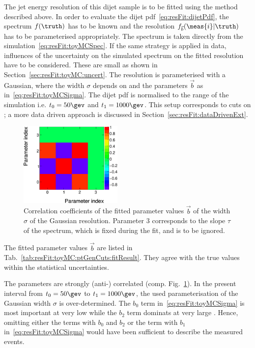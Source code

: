 \documentclass[a4paper]{cmspaper} %
\begin{document}
The jet energy resolution of this dijet sample is to be fitted using the method described above.
In order to evaluate the dijet pdf~\eqref{eq:resFit:dijetPdf}, the spectrum $f(\truth)$ has to be known and the resolution $f_{\vec{b}}(\meas{i}|\truth)$ has to be parameterised appropriately.
The spectrum is taken directly from the simulation~\eqref{eq:resFit:toyMCSpec}.
If the same strategy is applied in data, influences of the uncertainty on the simulated spectrum on the fitted resolution have to be considered.
These are small as shown in Section~\ref{sec:resFit:toyMC:uncert}.
The resolution is parameterised with a Gaussian, where the width $\sigma$ depends on \truth and the parameters $\vec{b}$ as in~\eqref{eq:resFit:toyMCSigma}.
The dijet pdf is normalised to the \truth range of the simulation i.e. $t_{0} = 50\gev$ and $t_{1} = 1000\gev$.
This setup corresponds to cuts on \truth; a more data driven approach is discussed in Section~\ref{sec:resFit:dataDrivenExt}.

\begin{figure}[ht]
  \centering
  \includegraphics[width=0.45\textwidth]{figures/resFit_ToyMC_PtGenCuts_Correlations}
  \caption{Correlation coefficients of the fitted parameter values
    $\vec{b}$ of the width $\sigma$ of the Gaussian
    resolution. Parameter $3$ corresponds to the slope $\tau$ of the
    spectrum, which is fixed during the fit, and is to be ignored.}
  \label{fig:resFit:toyMC:ptGenCuts:parCorr}
\end{figure}

The fitted parameter values $\vec{b}$ are listed in Tab.~\ref{tab:resFit:toyMC:ptGenCuts:fitResult}.
They agree with the true values within the statistical uncertainties.

The parameters are strongly (anti-) correlated (comp. Fig.~\ref{fig:resFit:toyMC:ptGenCuts:parCorr}).
In the present \truth interval from \mbox{$t_{0} = 50\gev$} to \mbox{$t_{1} = 1000\gev$}, the used parameterisation of the Gaussian width $\sigma$ is over-determined.
The $b_{0}$ term in~\eqref{eq:resFit:toyMCSigma} is most important at very low \pt while the $b_{2}$ term dominats at very large \pt.
Hence, omitting either the terms with $b_{0}$ and $b_{2}$ or the term with $b_{1}$ in~\eqref{eq:resFit:toyMCSigma} would have been sufficient to describe the measured events.
\end{document}
